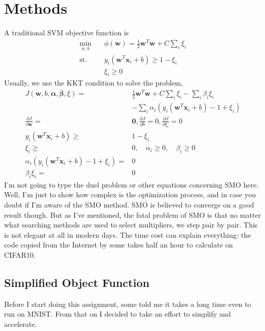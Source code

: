 \documentclass[conference]{IEEEtran}
\begin{document}
	\section{\textbf{Methods}}
	A traditional SVM objective function is
	\begin{equation}
		\begin{aligned}
			\min_{w,b} & \quad \phi(\mathbf{w}) = \frac{1}{2} \mathbf{w}^T \mathbf{w} + C \sum_i \xi_i \\
			\text{st.} & \quad y_i(\mathbf{w}^T \mathbf{x}_i + b) \geq 1 - \xi_i \\
			& \quad \xi_i \geq 0
		\end{aligned}
		\label{e1}
	\end{equation}
	Usually, we use the KKT condition to solve the problem, 
	\begin{equation}
		\begin{aligned}
			J(\mathbf{w}, b, \boldsymbol{\alpha}, \boldsymbol{\beta}, \xi) = & \frac{1}{2} \mathbf{w}^T \mathbf{w} + C \sum_i \xi_i - \sum_i \beta_i \xi_i \\
			& - \sum_i \alpha_i\left(y_i(\mathbf{w}^T \mathbf{x}_i + b) - 1 + \xi_i\right) \\
			\frac{\partial J}{\partial \mathbf{w}} = & \mathbf{0}, \frac{\partial J}{\partial b} = 0 , \frac{\partial J}{\partial \xi_i} = 0 \\
			y_i(\mathbf{w}^T \mathbf{x}_i + b) \geq & 1 - \xi_i \\
			\xi_i \geq & 0, \quad \alpha_i \geq 0, \quad \beta_i \geq 0 \\
			\alpha_i\left(y_i(\mathbf{w}^T \mathbf{x}_i + b) - 1 + \xi_i\right) = & 0 \\
			\beta_i \xi_i = & 0
		\end{aligned}
	\end{equation}
	I'm not going to type the duel problem or other equations concerning SMO here. Well, I'm just to show how complex is the optimization process, and in case you doubt if I'm aware of the SMO method. SMO is believed to converge on a good result though. But as I've mentioned, the fatal problem of SMO is that no matter what searching methods are used to select multipliers, we step pair by pair. This is not elegant at all in modern days. The time cost can explain everything: the code copied from the Internet by some takes half an hour to calculate on CIFAR10. 
	
	\subsection{Simplified Object Function}
	Before I start doing this assignment, some told me it takes a long time even to run on MNIST. From that on I decided to take an effort to simplify and accelerate. 
	
\end{document}
